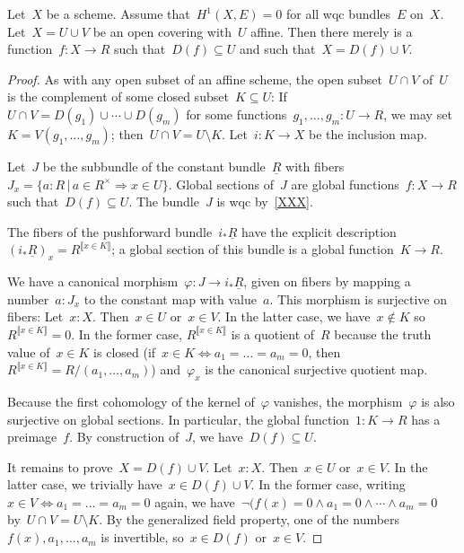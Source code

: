 \begin{lemma}\label{serre-workhorse}
  Let~$X$ be a scheme. Assume that~$H^1(X, E) = 0$ for all wqc bundles~$E$
  on~$X$. Let~$X = U \cup V$ be an open covering with~$U$ affine. Then there
  merely is a function~$f : X \to R$ such that~$D(f) \subseteq U$ and such
  that~$X = D(f) \cup V$.
\end{lemma}

\begin{proof}
  As with any open subset of an affine scheme, the open subset~$U \cap V$
  of~$U$ is the complement of some closed subset~$K \subseteq U$:
  If~$U \cap V = D(g_1) \cup \cdots \cup D(g_m)$ for some
  functions~$g_1,\ldots,g_m : U \to R$, we may set~$K = V(g_1,\ldots,g_m)$;
  then~$U \cap V = U \setminus K$. Let~$i : K \to X$ be the inclusion map.

  Let~$J$ be the subbundle of the constant bundle~$\underline{R}$ with
  fibers~$J_x = \{ a : R \,|\, a \in R^\times \Rightarrow x \in U \}$.
  Global sections of~$J$ are global functions~$f : X \to R$ such that~$D(f)
  \subseteq U$. The bundle~$J$ is wqc by~\cref{XXX}.

  The fibers of the pushforward bundle~$i_*\underline{R}$ have the explicit
  description~$(i_*\underline{R})_x = R^{\llbracket x \in K \rrbracket}$; a
  global section of this bundle is a global function~$K \to R$.

  We have a canonical morphism~$\varphi : J \to i_*\underline{R}$, given on
  fibers by mapping a number~$a : J_x$ to the constant map with value~$a$. This
  morphism is surjective on fibers: Let~$x : X$. Then~$x \in U$ or~$x \in V$.
  In the latter case, we have~$x \not\in K$ so~$R^{\llbracket x \in K
  \rrbracket} = 0$. In the former case, $R^{\llbracket x \in K \rrbracket}$ is
  a quotient of~$R$ because the truth value of~$x \in K$ is closed (if~$x \in K
  \Leftrightarrow a_1 = \ldots = a_m = 0$, then~$R^{\llbracket x \in K
  \rrbracket} = R/(a_1,\ldots,a_m)$) and~$\varphi_x$ is the canonical
  surjective quotient map.

  Because the first cohomology of the kernel of~$\varphi$ vanishes, the
  morphism~$\varphi$ is also surjective on global sections. In particular, the
  global function~$1 : K \to R$ has a preimage~$f$. By construction of~$J$,
  we have~$D(f) \subseteq U$.

  It remains to prove~$X = D(f) \cup V$. Let~$x : X$. Then~$x \in U$ or~$x \in V$.
  In the latter case, we trivially have~$x \in D(f) \cup V$. In the former
  case, writing~$x \in V \Leftrightarrow a_1 = \ldots = a_m = 0$ again,
  we have~$\neg(f(x) = 0 \wedge a_1 = 0 \wedge \cdots \wedge a_m = 0$ by~$U
  \cap V = U \setminus K$. By the generalized field property, one of the
  numbers~$f(x), a_1, \ldots, a_m$ is invertible, so~$x \in D(f)$ or~$x \in V$.
\end{proof}


